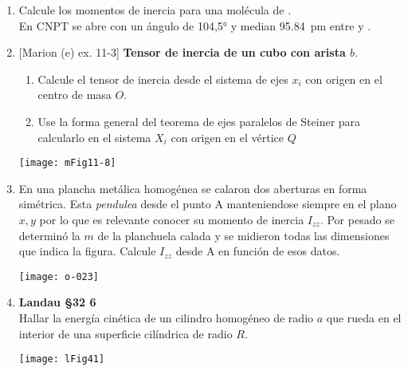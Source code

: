 \documentclass[11pt, spanish, a4paper, twoside]{article}
\begin{document}
\begin{enumerate}
	\item Calcule los momentos de inercia para una molécula de .\\
		En CNPT se abre con un ángulo de \ang{104,5;;} y median \SI{95.84}{\pico\metre} entre  y .



	\item 
		\begin{minipage}[t][3.7cm]{0.6\textwidth}
			[Marion (e) ex. 11-3] \textbf{Tensor de inercia de un cubo con arista \(b\)}.
				\begin{enumerate}
					\item Calcule el tensor de inercia desde el sistema de ejes \(x_i\) con origen en el centro de masa \(O\).
					\item Use la forma general del teorema de ejes paralelos de Steiner para calcularlo en el sistema \(X_i\) con origen en el vértice \(Q\) 
				\end{enumerate}
			\end{minipage}
			\begin{minipage}[c][1.2cm][t]{0.35\textwidth}
				\texttt{[image: mFig11-8]}
			\end{minipage}


		\item 
			\begin{minipage}[t][3.5cm]{0.5\textwidth}
				En una plancha metálica homogénea se calaron dos aberturas en forma simétrica.
				Esta \emph{pendulea} desde el punto A manteniendose siempre en el plano \(x,y\) por lo que es relevante conocer su momento de inercia \(I_{zz}\).
				Por pesado se determinó la $m$ de la planchuela calada y se midieron todas las dimensiones que indica la figura.
				Calcule \(I_{zz}\) desde A en función de esos datos.
			\end{minipage}
			\begin{minipage}[c][1.5cm][t]{0.45\textwidth}
				\texttt{[image: o-023]}
			\end{minipage}


		\item 
			\begin{minipage}[t][1.3cm]{0.65\textwidth}
				\textbf{Landau \S 32 6}\\%
				Hallar la energía cinética de un cilindro homogéneo de radio \(a\) que rueda en el interior de una superficie cilíndrica de radio \(R\).
			\end{minipage}
			\begin{minipage}[c][1.5cm][t]{0.3\textwidth}
				\texttt{[image: lFig41]}
			\end{minipage}




\end{enumerate}
\end{document}
